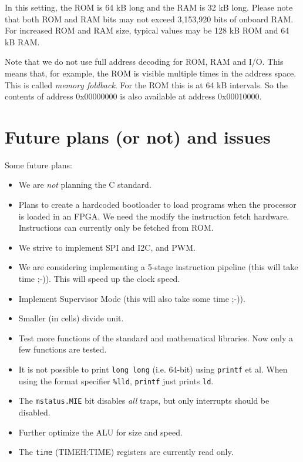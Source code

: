 \documentclass[12pt]{article}
\begin{document}
In this setting, the ROM is 64 kB long and the RAM is 32 kB long. Please note that both ROM and RAM bits may not exceed 3,153,920 bits of onboard RAM. For increased ROM and RAM size, typical values may be 128 kB ROM and 64 kB RAM.

Note that we do not use full address decoding for ROM, RAM and I/O. This means that, for example, the ROM is visible multiple times in the address space. This is called \emph{memory foldback}. For the ROM this is at 64 kB intervals. So the contents of address 0x00000000 is also available at address 0x00010000.

\section{Future plans (or not) and issues}
Some future plans:

\begin{itemize}
\item We are \emph{not} planning the C standard.
\item Plans to create a hardcoded bootloader to load programs when the processor is loaded in an FPGA. We need the modify the instruction fetch hardware. Instructions can currently only be fetched from ROM.
\item We strive to implement SPI and I2C, and PWM.
\item We are considering implementing a 5-stage instruction pipeline (this will take time ;-)). This will speed up the clock speed.
\item Implement Supervisor Mode (this will also take some time ;-)).
\item Smaller (in cells) divide unit.
\item Test more functions of the standard and mathematical libraries. Now only a few functions are tested.
\item It is not possible to print \texttt{long long} (i.e. 64-bit) using \texttt{printf} et al. When using the format specifier \texttt{\%lld}, \texttt{printf} just prints \texttt{ld}.
\item The \texttt{mstatus.MIE} bit disables \emph{all} traps, but only interrupts should be disabled.
\item Further optimize the ALU for size and speed.
\item The \texttt{time} (TIMEH:TIME) registers are currently read only.

\end{itemize}
\end{document}
